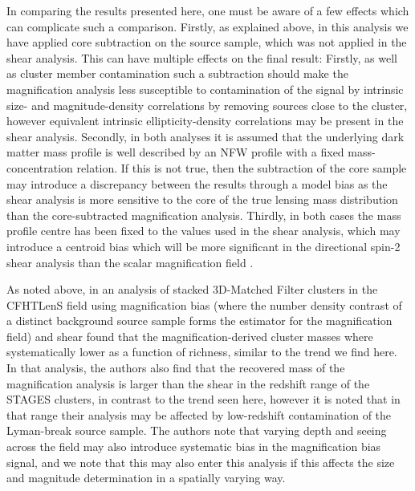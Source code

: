 \documentclass[useAMS,usenatbib,times,letter,amssymb]{mn2e}
\begin{document}
In comparing the results presented here, one must be aware of a few effects which can complicate such a comparison. Firstly, as explained above, in this analysis we have applied core subtraction on the source sample, which was not applied in the shear analysis. This can have multiple effects on the final result: Firstly, as well as cluster member contamination such a subtraction should make the magnification analysis less susceptible to contamination of the signal by intrinsic size- and magnitude-density correlations by removing sources close to the cluster, however equivalent intrinsic ellipticity-density correlations may be present in the shear analysis. Secondly, in both analyses it is assumed that the underlying dark matter mass profile is well described by an NFW profile with a fixed mass-concentration relation. If this is not true, then the subtraction of the core sample may introduce a discrepancy between the results through a model bias as the shear analysis is more sensitive to the core of the true lensing mass distribution than the core-subtracted magnification analysis. Thirdly, in both cases the mass profile centre has been fixed to the values used in the shear analysis, which may introduce a centroid bias which will be more significant in the directional spin-2 shear analysis than the scalar magnification field \citep[][for a description on how mis-centering may affect each measurement]{2007arXiv0709.1159J}.

As noted above, in \cite{Ford:2014p2825} an analysis of stacked 3D-Matched Filter clusters in the CFHTLenS field using magnification bias (where the number density contrast of a distinct background source sample forms the estimator for the magnification field) and shear found that the magnification-derived cluster masses where systematically lower as a function of richness, similar to the trend we find here. In that analysis, the authors also find that the recovered mass of the magnification analysis is larger than the shear in the redshift range of the STAGES clusters, in contrast to the trend seen here, however it is noted that in that range their analysis may be affected by low-redshift contamination of the Lyman-break source sample.  The authors note that varying depth and seeing across the field may also introduce systematic bias in the magnification bias signal, and we note that this may also enter this analysis if this affects the size and magnitude determination in a spatially varying way.
\end{document}
